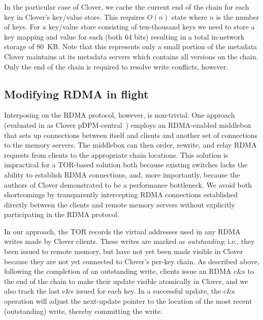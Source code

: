 

In the particular case of Clover, we cache the current end of the
chain for each key in Clover's key/value store. This requires $O(n)$
state where $n$ is the number of keys. For a key/value
store consisting of ten-thousand keys we need to store a key mapping
and value for each (both 64 bits) resulting in a total in-network
storage of 80~KB.  Note that this represents only a small portion of
the metadata Clover maintains at its metadata servers which contains
all versions on the chain.  Only the end of the chain is required to
resolve write conflicts, however.


\subsection{Modifying RDMA in flight}

Interposing on the RDMA protocol, however, is non-trivial. One
approach (evaluated in as Clover pDPM-central~\cite{clover}) employs
an RDMA-enabled middlebox that sets up connections between itself and
clients and another set of connections to the memory servers.  The
middlebox can then order, rewrite, and relay RDMA requests from
clients to the appropriate chain locations. This solution is
impractical for a TOR-based solution both because existing switches
lacks the ability to establish RDMA connections, and, more
importantly, because the authors of Clover demonstrated to be a
performance bottleneck.  We avoid both shortcomings by transparently
intercepting RDMA connections established directly between the clients
and remote memory servers without explicitly participating in the RDMA
protocol.

In our approach, the TOR records the virtual addresses used in any
RDMA writes made by Clover clients. These writes are marked as
\textit{outstanding}; i.e., they been issued to remote memory, but
have not yet been made visible in Clover because they are not yet
connected to Clover's per-key chain.  As described above, following
the completion of an outstanding write, clients issue an RDMA c\&s to
the end of the chain to make their update visible atomically in Clover,
and we also track the last c\&s issued for each key.  In a successful
update, the c\&s operation will adjust the next-update pointer to the
location of the most recent (outstanding) write, thereby committing the
write.


